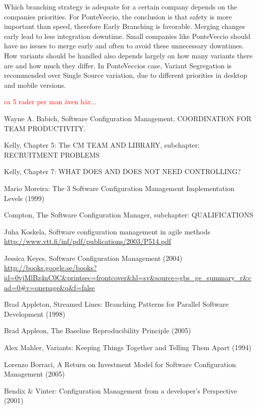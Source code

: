 \documentclass[10pt]{article}
\newcommand\remove[1]{\textcolor{red}{#1}}
\begin{document}
\noindent Which branching strategy is adequate for a certain company depends on the companies priorities. For PonteVeccio, the conclusion is that safety is more important than speed, therefore Early Branching is favorable. Merging changes early lead to less integration downtime. Small companies like PonteVeccio should have no issues to merge early and often to avoid these unnecessary downtimes. How variants should be handled also depends largely on how many variants there are and how much they differ. In PonteVeccios case, Variant Segregation is recommended over Single Source variation, due to different priorities in desktop and mobile versions.

\remove{ca 5 rader per man även här...}

\begin{thebibliography}{1}

 Wayne A. Babich, Software Configuration Management, COORDINATION FOR TEAM PRODUCTIVITY.

 Kelly, Chapter 5: The CM TEAM AND LIBRARY, subchapter: RECRUITMENT PROBLEMS 

 Kelly, Chapter 7: WHAT DOES AND DOES NOT NEED CONTROLLING? 

 Mario Moreira: The 3 Software Configuration Management Implementation Levels (1999)

Compton, The Software Configuration Manager, subchapter: QUALIFICATIONS

Juha Koskela, Software configuration management in agile methods
\url{http://www.vtt.fi/inf/pdf/publications/2003/P514.pdf}

 Jessica Keyes, Software Configuration Management (2004) \url{http://books.google.se/books?id=0vjMlBz4nC0C&printsec=frontcover&hl=sv&source=gbs_ge_summary_r&cad=0#v=onepage&q&f=false}

 Brad Appleton, Streamed Lines: Branching Patterns for Parallel Software Development (1998)

 Brad Appleon, The Baseline Reproducibility Principle (2005)

 Alex Mahler, Variants: Keeping Things Together and Telling Them Apart (1994)

 Lorenzo Borraci, A Return on Investment Model for Software Configuration Management (2005)

 Bendix \& Vinter: Configuration Management from a developer's Perspective (2001)


\end{thebibliography}
\end{document}
